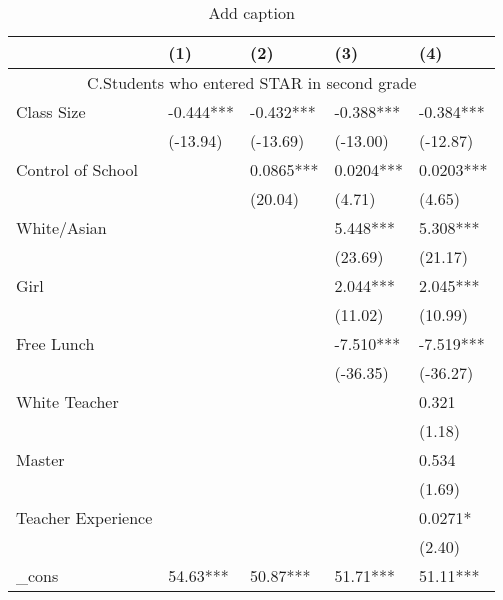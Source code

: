 \documentclass{article}
\begin{document}
{{{{{{{{{{{{{{{{{{%
\begin{table}[htbp]
  \centering
  \caption{Add caption}
  \label{tab:sub12}
    \begin{tabular}{lllrr}
    \toprule
          & (1)   & (2)   & \multicolumn{1}{l}{(3)} & \multicolumn{1}{l}{(4)} \\
    \midrule
    \multicolumn{5}{c}{C.Students who entered STAR in second grade} \\
    Class Size & -0.444*** & -0.432*** & \multicolumn{1}{l}{-0.388***} & \multicolumn{1}{l}{-0.384***} \\
          & (-13.94) & (-13.69) & \multicolumn{1}{l}{(-13.00)} & \multicolumn{1}{l}{(-12.87)} \\
    Control of School &       & 0.0865*** & \multicolumn{1}{l}{0.0204***} & \multicolumn{1}{l}{0.0203***} \\
          &       & (20.04) & \multicolumn{1}{l}{(4.71)} & \multicolumn{1}{l}{(4.65)} \\
    White/Asian &       &       & \multicolumn{1}{l}{5.448***} & \multicolumn{1}{l}{5.308***} \\
          &       &       & \multicolumn{1}{l}{(23.69)} & \multicolumn{1}{l}{(21.17)} \\
    Girl  &       &       & \multicolumn{1}{l}{2.044***} & \multicolumn{1}{l}{2.045***} \\
          &       &       & \multicolumn{1}{l}{(11.02)} & \multicolumn{1}{l}{(10.99)} \\
    Free Lunch &       &       & \multicolumn{1}{l}{-7.510***} & \multicolumn{1}{l}{-7.519***} \\
          &       &       & \multicolumn{1}{l}{(-36.35)} & \multicolumn{1}{l}{(-36.27)} \\
    White Teacher &       &       & \multicolumn{1}{l}{} & \multicolumn{1}{l}{0.321} \\
          &       &       & \multicolumn{1}{l}{} & \multicolumn{1}{l}{(1.18)} \\
    Master &       &       & \multicolumn{1}{l}{} & \multicolumn{1}{l}{0.534} \\
          &       &       & \multicolumn{1}{l}{} & \multicolumn{1}{l}{(1.69)} \\
    Teacher Experience &       &       & \multicolumn{1}{l}{} & \multicolumn{1}{l}{0.0271*} \\
          &       &       & \multicolumn{1}{l}{} & \multicolumn{1}{l}{(2.40)} \\
    \_cons & 54.63*** & 50.87*** & \multicolumn{1}{l}{51.71***} & \multicolumn{1}{l}{51.11***} \\

\end{tabular}
\end{table}}}}}}}}}}}}}}}}}}}
\end{document}
